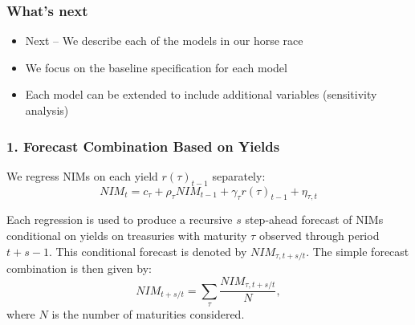 \documentclass[handout]{beamer}
\begin{document}
\begin{frame}
\frametitle{What's next}
\begin{itemize}

\item Next -- We describe each of the models in our horse race

\item We focus on the baseline specification for each model

\item Each model can be extended to include additional variables (sensitivity analysis)

\end{itemize}
\end{frame}

\begin{frame}

\frametitle{1. Forecast Combination Based on Yields }
We regress NIMs on each yield $r(\tau )_{t-1}$ separately: \
\begin{equation*}
NIM_{t}=c_{\tau }+\rho _{\tau }NIM_{t-1}+\gamma _{\tau }r(\tau )_{t-1}+{\eta
_{\tau ,t}}
\end{equation*}

Each regression is used to produce a recursive $s$ step-ahead forecast of NIMs
conditional on yields on treasuries with maturity $\tau $ observed through
period $t+s-1.$ This conditional forecast is denoted by $NIM_{\tau ,t+s/t}.$%
The simple forecast combination is then given by:%
\begin{equation*}
NIM_{t+s/t}=\sum_{\tau }\frac{NIM_{\tau ,t+s/t}}{N},
\end{equation*}%
where $N$ is the number of maturities considered.

\end{frame}
\end{document}
